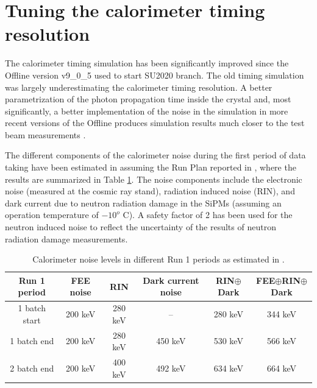 
\section{Tuning the calorimeter timing resolution}

The calorimeter timing simulation has been significantly improved since the Offline version
v9\_0\_5 used to start SU2020 branch.
The old timing simulation was largely underestimating the calorimeter timing resolution.
A better parametrization of the photon propagation time inside the crystal and, most significantly, a better implementation of the noise in the simulation in more recent versions of the Offline produces  simulation results much closer to the test beam measurements \cite{MU2E_35540_CALO_TIMING}.

The different components of the calorimeter noise during the first period of data taking have been estimated in \cite{MU2E_35519_CALO_NOISE} 
assuming the Run Plan reported in \cite{MU2E_33731_RUN1_PLAN}, where the results are summarized
in Table \ref{table:calonoise}. 
The noise components include the electronic noise (measured at the cosmic ray stand), 
radiation induced noise (RIN), and dark current due to neutron radiation damage
in the SiPMs (assuming an operation temperature of $-10^o$ C).
A safety factor of 2 has been used for the  neutron induced noise to reflect the uncertainty of the results of neutron radiation damage measurements.

\begin{table}[htbp]
  \begin{center} 
    \begin{tabular}{|c|c|c|c|c|c|}
      \hline
      Run 1 period      & FEE noise  & RIN     & Dark current noise & RIN$\oplus$Dark   & FEE$\oplus$RIN$\oplus$Dark \\ 
      \hline
      1 batch start     & 200 keV    & 280 keV &  --                & 280 keV & 344 keV  \\
      1 batch end       & 200 keV    & 280 keV &  450 keV           & 530 keV & 566 keV  \\
      2 batch end       & 200 keV    & 400 keV &  492 keV           & 634 keV & 664 keV \\
      \hline
    \end{tabular}
  \end{center}
  \caption{
  \label{table:calonoise}
    Calorimeter noise levels in different Run 1 periods as estimated in \cite{MU2E_35519_CALO_NOISE}. 
  }
\end{table}


